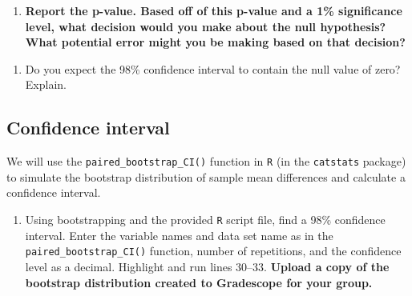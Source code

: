 \documentclass[
]{report}
\newenvironment{Shaded}{\begin{snugshade}}{\end{snugshade}}
\newcommand{\AttributeTok}[1]{\textcolor[rgb]{0.77,0.63,0.00}{#1}}
\newcommand{\CommentTok}[1]{\textcolor[rgb]{0.56,0.35,0.01}{\textit{#1}}}
\newcommand{\DecValTok}[1]{\textcolor[rgb]{0.00,0.00,0.81}{#1}}
\newcommand{\FunctionTok}[1]{\textcolor[rgb]{0.00,0.00,0.00}{#1}}
\newcommand{\NormalTok}[1]{#1}
\newcommand{\SpecialCharTok}[1]{\textcolor[rgb]{0.00,0.00,0.00}{#1}}
\providecommand{\tightlist}{%
  \setlength{\itemsep}{0pt}\setlength{\parskip}{0pt}}
\begin{document}
\begin{enumerate}
\def\labelenumi{\arabic{enumi}.}
\setcounter{enumi}{12}
\tightlist
\item
  \textbf{Report the p-value. Based off of this p-value and a 1\% significance level, what decision would you make about the null hypothesis? What potential error might you be making based on that decision?}
\end{enumerate}

\vspace{0.5in}

\begin{enumerate}
\def\labelenumi{\arabic{enumi}.}
\setcounter{enumi}{13}
\tightlist
\item
  Do you expect the 98\% confidence interval to contain the null value of zero? Explain.
\end{enumerate}

\vspace{0.8in}

\hypertarget{confidence-interval-1}{%
\subsection*{Confidence interval}\label{confidence-interval-1}}

We will use the \texttt{paired\_bootstrap\_CI()} function in \texttt{R} (in the \texttt{catstats} package) to simulate the bootstrap distribution of sample mean differences and calculate a confidence interval.

\begin{enumerate}
\def\labelenumi{\arabic{enumi}.}
\setcounter{enumi}{14}
\tightlist
\item
  Using bootstrapping and the provided \texttt{R} script file, find a 98\% confidence interval. Enter the variable names and data set name as in the \texttt{paired\_bootstrap\_CI()} function, number of repetitions, and the confidence level as a decimal. Highlight and run lines 30--33. \textbf{Upload a copy of the bootstrap distribution created to Gradescope for your group.}
\end{enumerate}

\begin{Shaded}
\end{Shaded}
\end{document}
